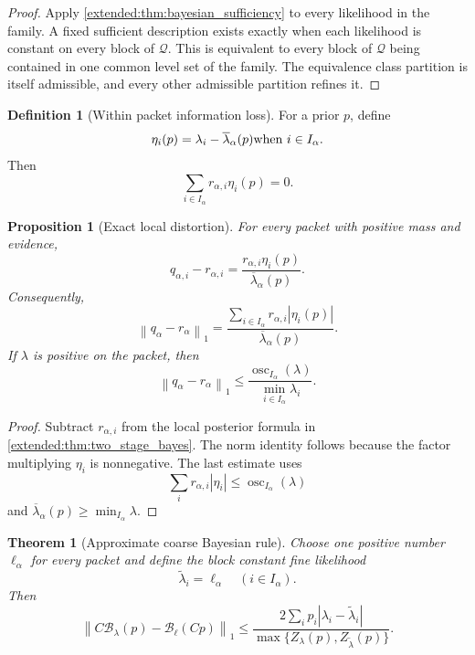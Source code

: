 \documentclass[11pt,letterpaper]{article}
\newtheorem{theorem}{Theorem}[section]
\theoremstyle{plain}
\newtheorem{proposition}[proposition]{Proposition}
\theoremstyle{plain}
\theoremstyle{plain}
\theoremstyle{definition}
\theoremstyle{definition}
\newtheorem{definition}[definition]{Definition}
\theoremstyle{definition}
\theoremstyle{definition}
\theoremstyle{definition}
\theoremstyle{remark}
\theoremstyle{remark}
\theoremstyle{remark}
\theoremstyle{remark}
\theoremstyle{remark}
\newcommand{\norm}[1]{\left\lVert#1\right\rVert}
\theoremstyle{remark}
\newcommand{\Bcal}{\mathcal B}
\newcommand{\osc}{\operatorname{osc}}
\newcommand{\abs}[1]{\left\lvert#1\right\rvert}
\let\KomorebiPrimitiveMathcal\mathcal
\renewcommand{\mathcal}[1]{{\KomorebiPrimitiveMathcal{#1}}}
\begin{document}
\begin{proof}
Apply \cref{extended:thm:bayesian_sufficiency} to every likelihood in the family. A fixed sufficient description exists exactly when each likelihood is constant on every block of \(\mathcal Q\). This is equivalent to every block of \(\mathcal Q\) being contained in one common level set of the family. The equivalence class partition is itself admissible, and every other admissible partition refines it.
\end{proof}

\begin{definition}[Within packet information loss]\label{extended:record:052}
For a prior \(p\), define
\[
\eta_i(p)
=
\lambda_i-\overline\lambda_\alpha(p)
\quad\hbox{when }i\in I_\alpha.
\]
Then
\[
\sum_{i\in I_\alpha}r_{\alpha,i}\eta_i(p)=0.
\]
\end{definition}

\begin{proposition}[Exact local distortion]\label{extended:record:053}\label{extended:prop:local_bayes_distortion}
For every packet with positive mass and evidence,
\[
q_{\alpha,i}-r_{\alpha,i}
=
\frac{r_{\alpha,i}\eta_i(p)}
{\overline\lambda_\alpha(p)}.
\]
Consequently,
\[
\norm{q_\alpha-r_\alpha}_1
=
\frac{
\sum_{i\in I_\alpha}r_{\alpha,i}\abs{\eta_i(p)}
}{\overline\lambda_\alpha(p)}.
\]
If \(\lambda\) is positive on the packet, then
\[
\norm{q_\alpha-r_\alpha}_1
\leq
\frac{\osc_{I_\alpha}(\lambda)}
{\min_{i\in I_\alpha}\lambda_i}.
\]
\end{proposition}

\begin{proof}
Subtract \(r_{\alpha,i}\) from the local posterior formula in \cref{extended:thm:two_stage_bayes}. The norm identity follows because the factor multiplying \(\eta_i\) is nonnegative. The last estimate uses
\[
\sum_i r_{\alpha,i}\abs{\eta_i}
\leq
\osc_{I_\alpha}(\lambda)
\]
and \(\overline\lambda_\alpha(p)\geq\min_{I_\alpha}\lambda\).
\end{proof}

\begin{theorem}[Approximate coarse Bayesian rule]\label{extended:record:054}\label{extended:thm:approximate_coarse_bayes}
Choose one positive number \(\ell_\alpha\) for every packet and define the block constant fine likelihood
\[
\widetilde\lambda_i=\ell_\alpha
\quad(i\in I_\alpha).
\]
Then
\[
\norm{
C\Bcal_\lambda(p)-\Bcal_\ell(Cp)
}_1
\leq
\frac{
2\sum_i p_i\abs{\lambda_i-\widetilde\lambda_i}
}{
\max\{Z_\lambda(p),Z_{\widetilde\lambda}(p)\}
}.
\]
\end{theorem}
\end{document}
